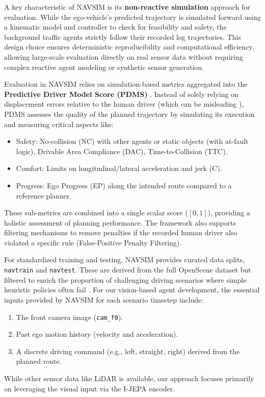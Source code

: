 \documentclass{article}
\begin{document}
A key characteristic of NAVSIM is its \textbf{non-reactive simulation} approach for evaluation. While the ego-vehicle's predicted trajectory is simulated forward using a kinematic model and controller to check for feasibility and safety, the background traffic agents strictly follow their recorded log trajectories. This design choice ensures deterministic reproducibility and computational efficiency, allowing large-scale evaluation directly on real sensor data without requiring complex reactive agent modeling or synthetic sensor generation.

Evaluation in NAVSIM relies on simulation-based metrics aggregated into the \textbf{Predictive Driver Model Score (PDMS)} \cite{dauner2024navsim, hallgarten2023pdm}. Instead of solely relying on displacement errors relative to the human driver (which can be misleading \cite{zhairet2023rethinking}), PDMS assesses the quality of the planned trajectory by simulating its execution and measuring critical aspects like:
\begin{itemize}
    \item Safety: No-collision (NC) with other agents or static objects (with at-fault logic), Drivable Area Compliance (DAC), Time-to-Collision (TTC).
    \item Comfort: Limits on longitudinal/lateral acceleration and jerk (C).
    \item Progress: Ego Progress (EP) along the intended route compared to a reference planner.
\end{itemize}
These sub-metrics are combined into a single scalar score ($[0, 1]$), providing a holistic assessment of planning performance. The framework also supports filtering mechanisms to remove penalties if the recorded human driver also violated a specific rule (False-Positive Penalty Filtering).

For standardized training and testing, NAVSIM provides curated data splits, \texttt{navtrain} and \texttt{navtest}. These are derived from the full OpenScene dataset but filtered to enrich the proportion of challenging driving scenarios where simple heuristic policies often fail \cite{dauner2024navsim}. For our vision-based agent development, the essential inputs provided by NAVSIM for each scenario timestep include:
\begin{enumerate}
    \item The front camera image (\texttt{cam\_f0}).
    \item Past ego motion history (velocity and acceleration).
    \item A discrete driving command (e.g., left, straight, right) derived from the planned route.
\end{enumerate}
While other sensor data like LiDAR is available, our approach focuses primarily on leveraging the visual input via the I-JEPA encoder.
\end{document}
